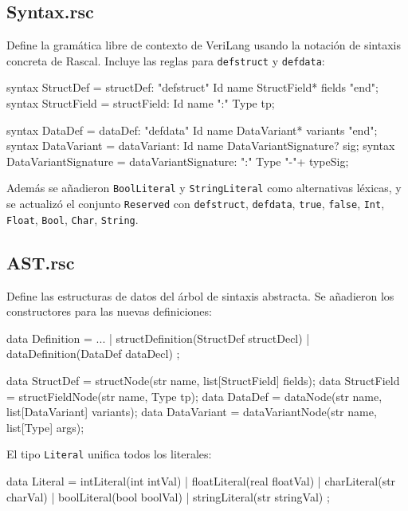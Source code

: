 \documentclass[12pt]{article}
\newcommand{\code}[1]{\texttt{#1}}
\begin{document}
\subsection{Syntax.rsc}

Define la gramática libre de contexto de VeriLang usando la notación de
sintaxis concreta de Rascal. Incluye las reglas para \code{defstruct}
y \code{defdata}:

\begin{rascal}
syntax StructDef = structDef:
  "defstruct" Id name StructField* fields "end";
syntax StructField = structField:
  Id name ":" Type tp;

syntax DataDef = dataDef:
  "defdata" Id name DataVariant* variants "end";
syntax DataVariant = dataVariant:
  Id name DataVariantSignature? sig;
syntax DataVariantSignature = dataVariantSignature:
  ":" {Type "-\>"}+ typeSig;
\end{rascal}

Además se añadieron \code{BoolLiteral} y \code{StringLiteral} como
alternativas léxicas, y se actualizó el conjunto \code{Reserved} con
\code{defstruct}, \code{defdata}, \code{true}, \code{false},
\code{Int}, \code{Float}, \code{Bool}, \code{Char}, \code{String}.

\subsection{AST.rsc}

Define las estructuras de datos del árbol de sintaxis abstracta. Se
añadieron los constructores para las nuevas definiciones:

\begin{rascal}
data Definition
  = ...
  | structDefinition(StructDef structDecl)
  | dataDefinition(DataDef dataDecl)
  ;

data StructDef = structNode(str name, list[StructField] fields);
data StructField = structFieldNode(str name, Type tp);
data DataDef = dataNode(str name, list[DataVariant] variants);
data DataVariant = dataVariantNode(str name, list[Type] args);
\end{rascal}

El tipo \code{Literal} unifica todos los literales:

\begin{rascal}
data Literal
  = intLiteral(int intVal)   | floatLiteral(real floatVal)
  | charLiteral(str charVal) | boolLiteral(bool boolVal)
  | stringLiteral(str stringVal)
  ;
\end{rascal}
\end{document}
